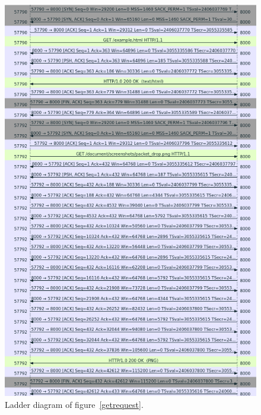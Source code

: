 \documentclass[titlepage]{article}
\begin{document}
\begin{figure}[H]
  \centering
  \includegraphics[width=\textwidth]{website_get_ladder.png}
  \caption{%
    Ladder diagram of figure~\ref{getrequest}.
  }\label{getrequestladder}
\end{figure}
\end{document}
